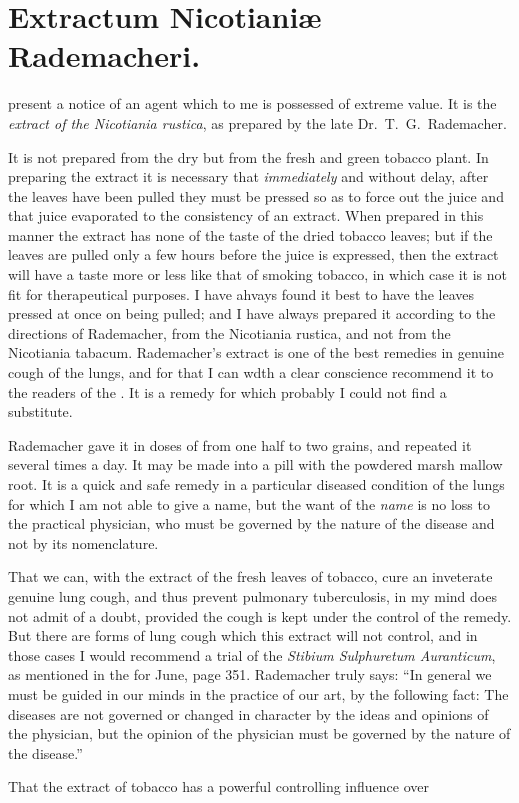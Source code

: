 \arrowbulletornament
\section*{Extractum Nicotianiæ Rademacheri.}


 present a notice of an agent which to me is possessed of
extreme value. It is the \emph{extract of the Nicotiania rustica}, as prepared
by the late Dr.\ T.~G.\ Rademacher.

It is not prepared from the dry but from the fresh and green tobacco
plant. In preparing the extract it is necessary that \emph{immediately} and
without delay, after the leaves have been pulled they must be pressed
so as to force out the juice and that juice evaporated to the consistency
of an extract. When prepared in this manner the extract has none of
the taste of the dried tobacco leaves; but if the leaves are pulled only
a few hours before the juice is expressed, then the extract will have a
taste more or less like that of smoking tobacco, in which case it is not
fit for therapeutical purposes. I have ahvays found it best to have the
leaves pressed at once on being pulled; and I have always prepared it
according to the directions of Rademacher, from the Nicotiania rustica,
and not from the Nicotiania tabacum. Rademacher's extract is one of
the best remedies in genuine cough of the lungs, and for that I can wdth
a clear conscience recommend it to the readers of the .
It is a remedy for which probably I could not find a substitute.

Rademacher gave it in doses of from one half to two grains, and repeated
it several times a day. It may be made into a pill with the
powdered marsh mallow root. It is a quick and safe remedy in a particular
diseased condition of the lungs for which I am not able to give
a name, but the want of the \emph{name} is no loss to the practical physician,
who must be governed by the nature of the disease and not by its
nomenclature.

That we can, with the extract of the fresh leaves of tobacco, cure an
inveterate genuine lung cough, and thus prevent pulmonary tuberculosis,
in my mind does not admit of a doubt, provided the cough is kept under
the control of the remedy. But there are forms of lung cough which
this extract will not control, and in those cases I would recommend a
trial of the \emph{Stibium Sulphuretum Auranticum}, as mentioned in the
 for June, page 351. Rademacher truly says: ``In
general we must be guided in our minds in the practice of our art, by
the following fact: The diseases are not governed or changed in character
by the ideas and opinions of the physician, but the opinion of
the physician must be governed by the nature of the disease.''

That the extract of tobacco has a powerful controlling influence over\endinput
